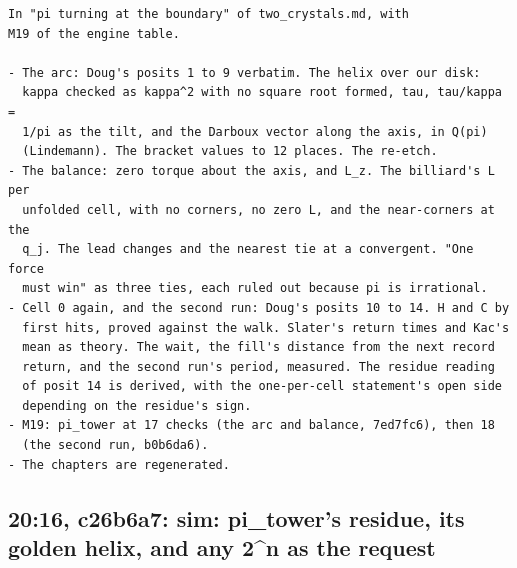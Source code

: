 \begin{Verbatim}
In "pi turning at the boundary" of two_crystals.md, with
M19 of the engine table.

- The arc: Doug's posits 1 to 9 verbatim. The helix over our disk:
  kappa checked as kappa^2 with no square root formed, tau, tau/kappa =
  1/pi as the tilt, and the Darboux vector along the axis, in Q(pi)
  (Lindemann). The bracket values to 12 places. The re-etch.
- The balance: zero torque about the axis, and L_z. The billiard's L per
  unfolded cell, with no corners, no zero L, and the near-corners at the
  q_j. The lead changes and the nearest tie at a convergent. "One force
  must win" as three ties, each ruled out because pi is irrational.
- Cell 0 again, and the second run: Doug's posits 10 to 14. H and C by
  first hits, proved against the walk. Slater's return times and Kac's
  mean as theory. The wait, the fill's distance from the next record
  return, and the second run's period, measured. The residue reading
  of posit 14 is derived, with the one-per-cell statement's open side
  depending on the residue's sign.
- M19: pi_tower at 17 checks (the arc and balance, 7ed7fc6), then 18
  (the second run, b0b6da6).
- The chapters are regenerated.
\end{Verbatim}

\subsection{\texorpdfstring{20:16, c26b6a7: sim: pi\_\allowbreak{}tower's residue, its golden helix, and any 2\textasciicircum{}n as the request}{20:16, c26b6a7: sim: pi\_tower's residue, its golden helix, and any 2\textasciicircum{}n as the request}}

